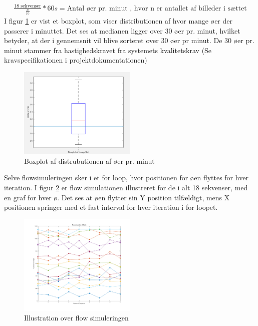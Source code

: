 \begin{align}
\frac{18\text{ sekvenser}}{\frac{n}{10}} * 60s = \text{Antal øer pr. minut}
\text{ , hvor n er antallet af billeder i sættet}
\label{formular:isletprmin}
\end{align} 
I figur \ref{fig:boxplot} er vist et boxplot, som viser distributionen af hvor mange øer der passerer i minuttet. Det ses at medianen ligger over 30 øer pr. minut, hvilket betyder, at der i gennemsnit vil blive sorteret over 30 øer pr minut. De 30 øer pr. minut stammer fra hastighedskravet fra systemets kvalitetskrav (Se kravspecifikationen i projektdokumentationen)

 \begin{figure}[H]
	\centering
	\includegraphics[width=0.5\textwidth]{billeder/software/boxplot.png}
	\caption{Boxplot af distrubutionen af øer pr. minut}
	\label{fig:boxplot}
\end{figure}

Selve flowsimuleringen sker i et for loop, hvor positionen for øen flyttes for hver iteration. I figur \ref{fig:flowsim} er flow simulationen illustreret for de i alt 18 sekvenser, med en graf for hver ø. Det ses at øen flytter sin Y position tilfældigt, mens X positionen springer med et fast interval for hver iteration i for loopet.

\begin{figure}[H]
	\centering
	\includegraphics[width=0.5\textwidth]{billeder/software/Simulation.png}
	\caption{Illustration over flow simuleringen}
	\label{fig:flowsim}
\end{figure}


